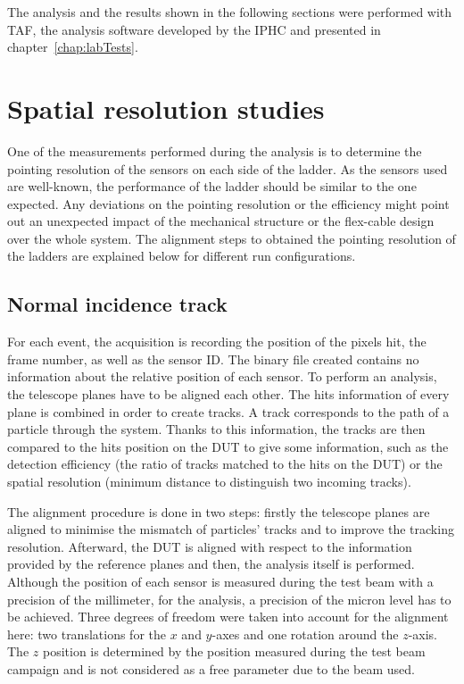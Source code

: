     The analysis and the results shown in the following sections were performed with \gls{TAF}, the analysis software developed by the IPHC and presented in chapter~\ref{chap:labTests}.

  \section{Spatial resolution studies}
   
    One of the measurements performed during the analysis is to determine the pointing resolution of the sensors on each side of the ladder.
    As the sensors used are well-known, the performance of the ladder should be similar to the one expected.
    Any deviations on the pointing resolution or the efficiency might point out an unexpected impact of the mechanical structure or the flex-cable design over the whole system.
    The alignment steps to obtained the pointing resolution of the ladders are explained below for different run configurations. 

    \subsection{Normal incidence track}
     
    For each event, the acquisition is recording the position of the pixels hit, the frame number, as well as the sensor ID.
    The binary file created contains no information about the relative position of each sensor.
    To perform an analysis, the telescope planes have to be aligned each other.
    The hits information of every plane is combined in order to create tracks. 
    A track corresponds to the path of a particle through the system.
    Thanks to this information, the tracks are then compared to the hits position on the \gls{DUT} to give some information, such as the detection efficiency (the ratio of tracks matched to the hits on the \gls{DUT}) or the spatial resolution (minimum distance to distinguish two incoming tracks).

    The alignment procedure is done in two steps: firstly the telescope planes are aligned to minimise the mismatch of particles' tracks and to improve the tracking resolution.
    Afterward, the \gls{DUT} is aligned with respect to the information provided by the reference planes and then, the analysis itself is performed.
    Although the position of each sensor is measured during the test beam with a precision of the millimeter, for the analysis, a precision of the micron level has to be achieved.
    Three degrees of freedom were taken into account for the alignment here: two translations for the $x$ and $y$-axes and one rotation around the $z$-axis.
    The $z$ position is determined by the position measured during the test beam campaign and is not considered as a free parameter due to the beam used.

